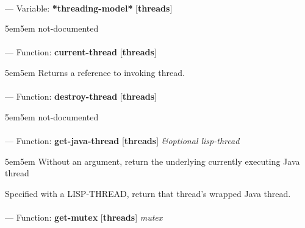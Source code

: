\paragraph{}
\label{THREADS:*THREADING-MODEL*}
--- Variable: \textbf{*threading-model*} [\textbf{threads}] \textit{}

\begin{adjustwidth}{5em}{5em}
not-documented
\end{adjustwidth}

\paragraph{}
\label{THREADS:CURRENT-THREAD}
--- Function: \textbf{current-thread} [\textbf{threads}] \textit{}

\begin{adjustwidth}{5em}{5em}
Returns a reference to invoking thread.
\end{adjustwidth}

\paragraph{}
\label{THREADS:DESTROY-THREAD}
--- Function: \textbf{destroy-thread} [\textbf{threads}] \textit{}

\begin{adjustwidth}{5em}{5em}
not-documented
\end{adjustwidth}

\paragraph{}
\label{THREADS:GET-JAVA-THREAD}
--- Function: \textbf{get-java-thread} [\textbf{threads}] \textit{\&optional lisp-thread}

\begin{adjustwidth}{5em}{5em}
Without an argument, return the underlying currently executing Java thread

Specified with a LISP-THREAD, return that thread's wrapped Java
thread.
\end{adjustwidth}

\paragraph{}
\label{THREADS:GET-MUTEX}
--- Function: \textbf{get-mutex} [\textbf{threads}] \textit{mutex}

